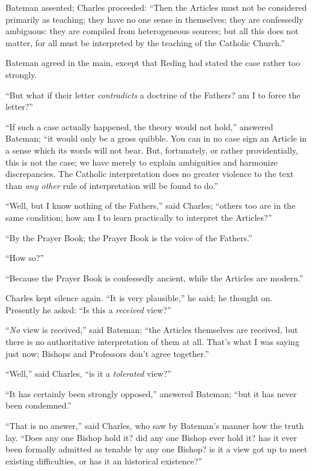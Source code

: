 Bateman assented; Charles proceeded: ``Then the Articles must
not be considered primarily as teaching; they have no one sense in
themselves; they are confessedly ambiguous: they are compiled from
heterogeneous sources; but all this does not matter, for all must be interpreted by the teaching of the Catholic Church.''

Bateman agreed in the main, except that Reding had stated the case
rather too strongly.

``But what if their letter \emph{contradicts} a doctrine of the
Fathers? am I to force the letter?''

``If such a case actually happened, the theory would not hold,''
answered Bateman; ``it would only be a gross quibble. You can in
no case sign an Article in a sense which its words will not bear. But,
fortunately, or rather providentially, this is not the case; we have
merely to explain ambiguities and harmonize discrepancies. The
Catholic interpretation does no greater violence to the text than \emph{any
other} rule of interpretation will be found to do.''

``Well, but I know nothing of the Fathers,'' said Charles;
``others too are in the same condition; how am I to learn
practically to interpret the Articles?''

``By the Prayer Book; the Prayer Book is the voice of the
Fathers.''

``How so?''

``Because the Prayer Book is confessedly ancient, while the
Articles are modern.''

Charles kept silence again. ``It is very plausible,'' he
said; he thought on. Presently he asked: ``Is this a \emph{received}
view?''

``\emph{No} view is received,'' said Bateman; ``the
Articles themselves are received, but there is no authoritative
interpretation of them at all. That's what I was saying just now;
Bishops and Professors don't agree together.''

``Well,'' said Charles, ``is it a \emph{tolerated}
view?''

``It has certainly been strongly opposed,'' answered
Bateman; ``but it has never been condemned.''

``That is no answer,'' said Charles, who saw by Bateman's
manner how the truth lay. ``Does any one Bishop hold it? did any
one Bishop ever hold it? has it ever been formally admitted as tenable
by any one Bishop? is it a view got up to meet existing difficulties,
or has it an historical existence?''

